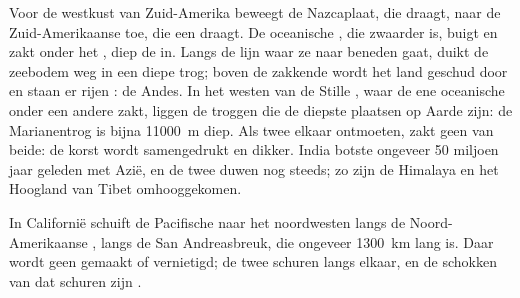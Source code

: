 \begin{example}\label{ex:g7:plate-tectonics:convergent}
Voor de westkust van Zuid-Amerika beweegt de Nazcaplaat, die 
draagt, naar de Zuid-Amerikaanse  toe, die een  draagt. De
oceanische , die zwaarder is, buigt en zakt onder het , diep
de  in. Langs de lijn waar ze naar beneden gaat, duikt de zeebodem
weg in een diepe trog; boven de zakkende  wordt het land geschud door
 en staan er rijen : de Andes. In het westen van de
Stille , waar de ene oceanische  onder een andere zakt, liggen
de troggen die de diepste plaatsen op Aarde zijn: de Marianentrog is bijna
\qty{11000}{m} diep. Als twee  elkaar ontmoeten, zakt geen van
beide: de korst wordt samengedrukt en dikker. India botste ongeveer
50 miljoen jaar geleden met Azië, en de twee  duwen nog steeds; zo
zijn de Himalaya en het Hoogland van Tibet omhooggekomen.
\end{example}

\begin{example}\label{ex:g7:plate-tectonics:transform}
In Californië schuift de Pacifische  naar het noordwesten langs de
Noord-Amerikaanse , langs de San Andreasbreuk, die ongeveer
\qty{1300}{km} lang is. Daar wordt geen  gemaakt of vernietigd; de twee
 schuren langs elkaar, en de schokken van dat schuren zijn
.
\end{example}

